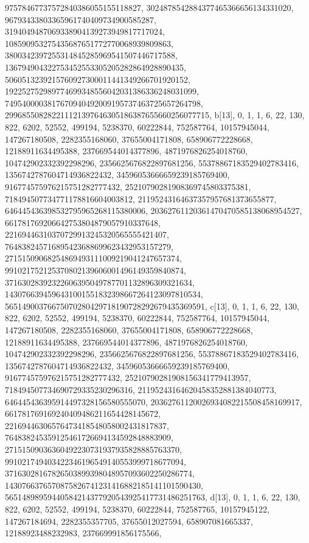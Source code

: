 {{{   97578467737572840386055155118827, 3024878542884377465366656134331020, 
   96793433803365961740409734900585287, 
   3194049487069338904139273949817717024, 
   108590953275435687651772770068939809863, 
   3800342397255314845285969541507446717588, 
   136794904322753452553305205282864928890435, 
   5060513239215760927300011441349266701920152, 
   192252752989774699348556042031386336248031099, 
   7495400003817670940492009195737463725657264798, 
   299685508282211121397646305186387655660256077715}}, 
 {b[13], {0, 1, 1, 6, 22, 130, 822, 6202, 52552, 499194, 5238370, 60222844, 
   752587764, 10157945044, 147267180508, 2282355168060, 37655004171808, 
   658906772228668, 12188911634495388, 237669544014377896, 
   4871976826254018760, 104742902332392298296, 2356625676822897681256, 
   55378867183529402783416, 1356742787604714936822432, 
   34596053666659239185769400, 916774575976215751282777432, 
   25210790281908369745803375381, 718494507734771178816604003812, 
   21195243164637357957681373655877, 646445436398532795965268115380006, 
   20362761120361470470585138068954527, 661781769206642753804879057910337648, 
   22169446310370729913245320565555421407, 
   764838245716895423688699623432953157279, 
   27151509068254869493111009219041247657374, 
   991021752125370802139606001496149359840874, 
   37163028392322606395049787701132896309321634, 
   1430766394596431001551832398667264123097810534, 
   56514900376675070280429718190728292679435369591}}, 
 {c[13], {0, 1, 1, 6, 22, 130, 822, 6202, 52552, 499194, 5238370, 60222844, 
   752587764, 10157945044, 147267180508, 2282355168060, 37655004171808, 
   658906772228668, 12188911634495388, 237669544014377896, 
   4871976826254018760, 104742902332392298296, 2356625676822897681256, 
   55378867183529402783416, 1356742787604714936822432, 
   34596053666659239185769400, 916774575976215751282777432, 
   25210790281908156341779413957, 718494507734690729335230296316, 
   21195243164620458352881384040773, 646445436395914497328156580555070, 
   20362761120026934082215508458169917, 661781769169240409486211654428145672, 
   22169446306576473418548058002431817837, 
   764838245359125461726694134592848883909, 
   27151509036360492230731937935828885763370, 
   991021749403422346196549140553999718677094, 
   37163028167826503899398048957093602250286774, 
   1430766376570875826741231416882185141101590430, 
   56514898959440584214377920543925417731486251763}}, 
 {d[13], {0, 1, 1, 6, 22, 130, 822, 6202, 52552, 499194, 5238370, 60222844, 
   752587765, 10157945122, 147267184694, 2282355357705, 37655012027594, 
   658907081665337, 12188923488232983, 237669991856175566, 
}}}
